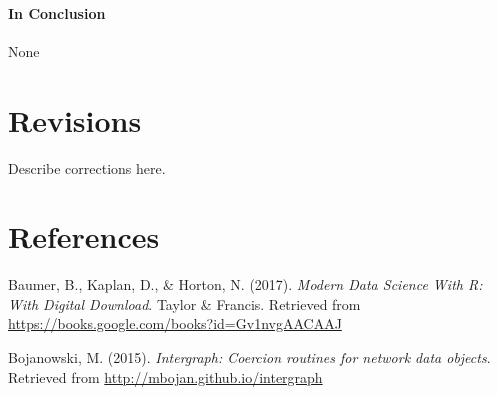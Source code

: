 \documentclass[12pt,twoside]{amherstthesis}
\begin{document}
\begin{Shaded}
\begin{Highlighting}[]
  
  
  
  \end{Highlighting}
  \end{Shaded}
  
  \subsubsection{In Conclusion}\label{in-conclusion}
  
  None
  
  \chapter{Revisions}\label{revisions}
  
  Describe corrections here.
  
  \backmatter
  
  \chapter{References}\label{references}
  
  \noindent
  
  \setlength{\parindent}{-0.20in} \setlength{\leftskip}{0.20in}
  \setlength{\parskip}{8pt}
  
  \hypertarget{refs}{}
  \hypertarget{ref-baumer_modern_2017}{}
  Baumer, B., Kaplan, D., \& Horton, N. (2017). \emph{Modern Data Science
  With R: With Digital Download}. Taylor \& Francis. Retrieved from
  \url{https://books.google.com/books?id=Gv1nvgAACAAJ}
  
  \hypertarget{ref-intergraphpackagemanual}{}
  Bojanowski, M. (2015). \emph{Intergraph: Coercion routines for network
  data objects}. Retrieved from \url{http://mbojan.github.io/intergraph}
  
\end{document}
